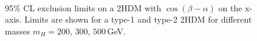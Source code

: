 \begin{figure}[H]
{}
\\

\caption{95$\%$ CL exclusion limits on a 2HDM with $\cos(\beta-\alpha)$ on the x-axis. Limits are shown for a type-1 and type-2 2HDM for different masses $m_{H}=200$, $300$, $500\,$GeV.}
    \label{fig:2HDMa}
\end{figure}

